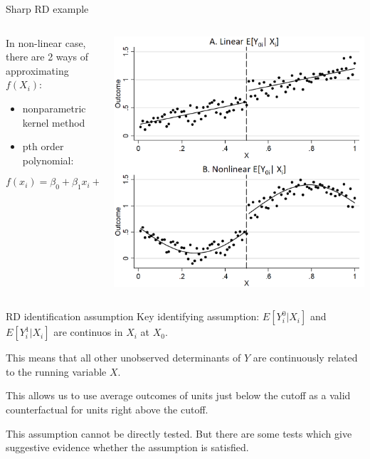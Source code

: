 \documentclass[handout]{beamer}
\begin{document}
\begin{frame}{Sharp RD example}
	\begin{columns}
		\begin{column}{.4\textwidth}
In non-linear case, there are 2 ways of approximating $f(X_i)$:

\begin{itemize}
	\item nonparametric kernel method
	\item pth order polynomial:\end{itemize}
	\[f(x_i)=\beta_0+\beta_1x_i+\dots+\beta_nx_i^n\]


		\end{column}
		\begin{column}{.6\textwidth}
		\includegraphics[width=\linewidth]{./Figures/RDsharp}
		\end{column}
	\end{columns}
\end{frame}

\begin{frame}{RD identification assumption}
	Key identifying assumption:
	$E[Y^0_i|X_i ]$ and $E[Y^1_i|X_i ]$ are continuos in $X_i$ at $X_0$.\medskip
	
	This means that all other unobserved determinants of $Y$ are
	continuously related to the running variable $X$.\medskip
	
	This allows us to use average outcomes of units just below the cutoff
	as a valid counterfactual for units right above the cutoff.\medskip
	
	This assumption cannot be directly tested. But there are some tests
	which give suggestive evidence whether the assumption is satisfied.
\end{frame}
\end{document}
